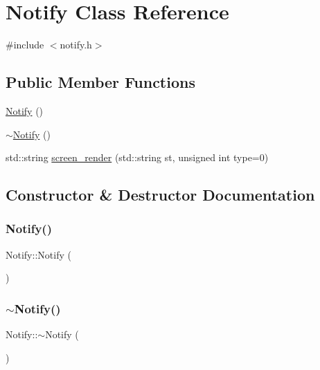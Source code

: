 \hypertarget{class_notify}{}\section{Notify Class Reference}
\label{class_notify}


{\ttfamily \#include $<$notify.\+h$>$}

\subsection*{Public Member Functions}
\begin{DoxyCompactItemize}
\item 
\mbox{\hyperlink{class_notify_a76566a48401667bd9382a169c2a76ed2}{Notify}} ()
\item 
\mbox{\hyperlink{class_notify_a621d36ca663f0c8460c82611c708b51e}{$\sim$\+Notify}} ()
\item 
std\+::string \mbox{\hyperlink{class_notify_a7055e1a2409ac4f55021e171ce6942e1}{screen\+\_\+render}} (std\+::string st, unsigned int type=0)
\end{DoxyCompactItemize}


\subsection{Constructor \& Destructor Documentation}
\mbox{\label{class_notify_a76566a48401667bd9382a169c2a76ed2}} 
\subsubsection{\texorpdfstring{Notify()}{Notify()}}
{\footnotesize\ttfamily Notify\+::\+Notify (\begin{DoxyParamCaption}{ }\end{DoxyParamCaption})}

\mbox{\label{class_notify_a621d36ca663f0c8460c82611c708b51e}} 
\subsubsection{\texorpdfstring{$\sim$\+Notify()}{~Notify()}}
{\footnotesize\ttfamily Notify\+::$\sim$\+Notify (\begin{DoxyParamCaption}{ }\end{DoxyParamCaption})}



